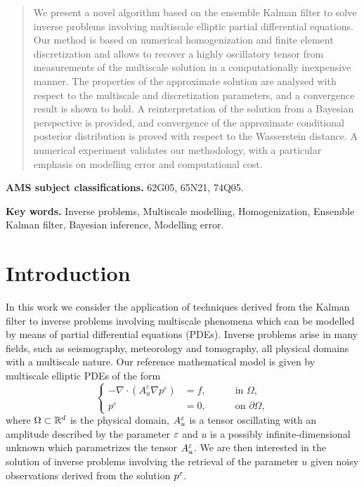 \documentclass[10pt]{article}
\begin{document}
\maketitle

\begin{abstract} We present a novel algorithm based on the ensemble Kalman filter to solve inverse problems involving multiscale elliptic partial differential equations. Our method is based on numerical homogenization and finite element discretization and allows to recover a highly oscillatory tensor from measurements of the multiscale solution in a computationally inexpensive manner. The properties of the approximate solution are analysed with respect to the multiscale and discretization parameters, and a convergence result is shown to hold. A reinterpretation of the solution from a Bayesian perspective is provided, and convergence of the approximate conditional posterior distribution is proved with respect to the Wasserstein distance. A numerical experiment validates our methodology, with a particular emphasis on modelling error and computational cost.
\end{abstract}

\textbf{AMS subject classifications.} 62G05, 65N21, 74Q05.

\textbf{Key words.} Inverse problems, Multiscale modelling, Homogenization, Ensemble Kalman filter, Bayesian inference, Modelling error.

\section{Introduction}

In this work we consider the application of techniques derived from the Kalman filter to inverse problems involving multiscale phenomena which can be modelled by means of partial differential equations (PDEs). Inverse problems arise in many fields, such as seismography, meteorology and tomography, all physical domains with a multiscale nature. Our reference mathematical model is given by multiscale elliptic PDEs of the form
\begin{equation}
\left\{
\begin{alignedat}{2}
- \nabla \cdot ( A^{\varepsilon}_u \nabla p^{\varepsilon} ) &= f, \quad && \text{ in } \Omega, \\
p^{\varepsilon} &= 0, \quad && \text{ on } \partial \Omega,
\end{alignedat}
\right.
\end{equation}
where $\Omega \subset \mathbb{R}^d$ is the physical domain, $A_u^\varepsilon$ is a tensor oscillating with an amplitude described by the parameter $\varepsilon$ and $u$ is a possibly infinite-dimensional unknown which parametrizes the tensor $A^\varepsilon_u$. We are then interested in the solution of inverse problems involving the retrieval of the parameter $u$ given noisy observations derived from the solution $p^\varepsilon$.
\end{document}
